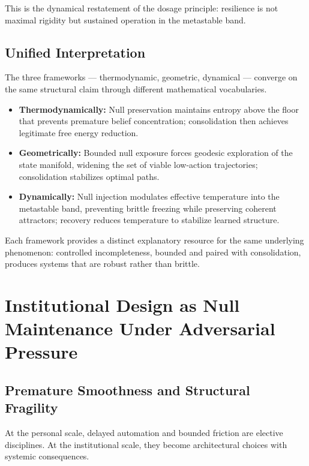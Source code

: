\documentclass[11pt]{article}
\theoremstyle{remark}
\begin{document}
This is the dynamical restatement of the dosage principle: resilience is not maximal rigidity but sustained operation in the metastable band.

\subsection{Unified Interpretation}

The three frameworks — thermodynamic, geometric, dynamical — converge on the same structural claim through different mathematical vocabularies.

\begin{itemize}
  \item \textbf{Thermodynamically:} Null preservation maintains entropy above the floor that prevents premature belief concentration; consolidation then achieves legitimate free energy reduction.
  \item \textbf{Geometrically:} Bounded null exposure forces geodesic exploration of the state manifold, widening the set of viable low-action trajectories; consolidation stabilizes optimal paths.
  \item \textbf{Dynamically:} Null injection modulates effective temperature into the metastable band, preventing brittle freezing while preserving coherent attractors; recovery reduces temperature to stabilize learned structure.
\end{itemize}

Each framework provides a distinct explanatory resource for the same underlying phenomenon: controlled incompleteness, bounded and paired with consolidation, produces systems that are robust rather than brittle.


\section{Institutional Design as Null Maintenance Under Adversarial Pressure}
\label{sec:institutional}

\subsection{Premature Smoothness and Structural Fragility}

At the personal scale, delayed automation and bounded friction are elective disciplines. At the institutional scale, they become architectural choices with systemic consequences.
\end{document}
